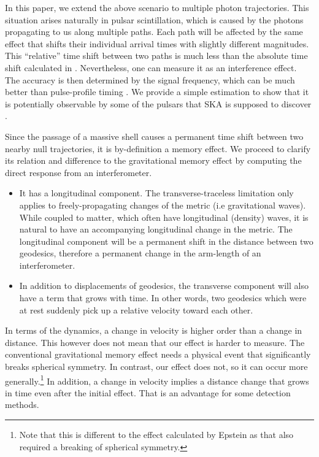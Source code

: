 \documentclass[aps,showpacs,onecolumn,floats,prd,superscriptaddress,nofootinbib]{revtex4-1}
\begin{document}
In this paper, we extend the above scenario to multiple photon trajectories.
This situation arises naturally in pulsar scintillation, which is caused by the photons propagating to us along multiple paths. 
Each path will be affected by the same effect that shifts their individual arrival times with slightly different magnitudes.
This ``relative'' time shift between two paths is much less than the absolute time shift calculated in \cite{Olum:2013gza, PhysRevD.93.103006}. 
Nevertheless, one can measure it as an interference effect.
The accuracy is then determined by the signal frequency, which can be much better than pulse-profile timing \cite{PenYan14}.
We provide a simple estimation to show that it is potentially observable by some of the pulsars that SKA is supposed to discover \cite{MSPpopulation}. 

Since the passage of a massive shell causes a permanent time shift between two nearby null trajectories, it is by-definition a memory effect.
We proceed to clarify its relation and difference to the gravitational memory effect \cite{Christodoulou_effect,GW_memory} by computing the direct response from an interferometer.


\begin{itemize}
\item It has a longitudinal component. The transverse-traceless limitation only applies to freely-propagating changes of the metric (i.e gravitational waves). 
While coupled to matter, which often have longitudinal (density) waves, it is natural to have an accompanying longitudinal change in the metric. 
The longitudinal component will be a permanent shift in the distance between two geodesics, therefore a permanent change in the arm-length of an interferometer.
\item In addition to displacements of geodesics, the transverse component will also have a term that grows with time. 
In other words, two geodesics which were at rest suddenly pick up a relative velocity toward each other.
\end{itemize}
In terms of the dynamics, a change in velocity is higher order than a change in distance.
This however does not mean that our effect is harder to measure. 
The conventional gravitational memory effect needs a physical event that significantly breaks spherical symmetry. 
In contrast, our effect does not, so it can occur more generally.\footnote{Note that this is different to the effect calculated by Epstein \cite{Epstein:1978dv} as that also required a breaking of spherical symmetry.}
In addition, a change in velocity implies a distance change that grows in time even after the initial effect. 
That is an advantage for some detection methods.  
\end{document}
